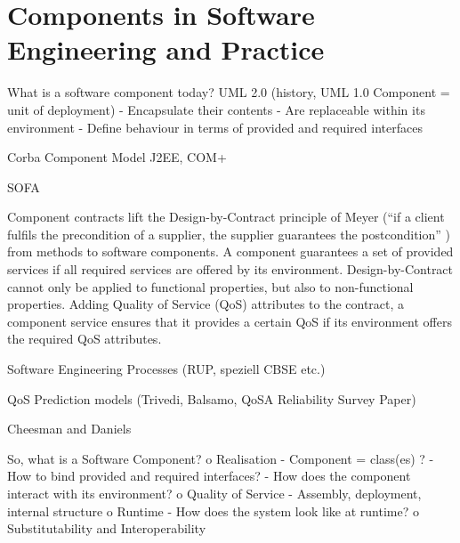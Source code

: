 \section{Components in Software Engineering and Practice}
What is a software component today?
UML 2.0 (history, UML 1.0 Component = unit of deployment)
-	Encapsulate their contents
-	Are replaceable within its environment
-	Define behaviour in terms of provided and required interfaces

Corba Component Model
J2EE, COM+

SOFA

Component contracts lift the Design-by-Contract principle of Meyer (``if a client fulfils the precondition of a supplier, the supplier guarantees the postcondition'' \cite{meyer1992a}) from methods to software components. A component guarantees a set of provided services if all required services are offered by its environment. Design-by-Contract cannot only be applied to functional properties, but also to non-functional properties. Adding Quality of Service (QoS) attributes to the contract, a component service ensures that it provides a certain QoS if its environment offers the required QoS attributes. 


Software Engineering Processes (RUP, speziell CBSE etc.)

QoS Prediction models (Trivedi, Balsamo, QoSA Reliability Survey Paper)

Cheesman and Daniels

So, what is a Software Component?
o	Realisation
-	Component = class(es) ?
-	How to bind provided and required interfaces?
-	How does the component interact with its environment?
o	Quality of Service
-	Assembly, deployment, internal structure
o	Runtime
-	How does the system look like at runtime?
o	Substitutability and Interoperability
